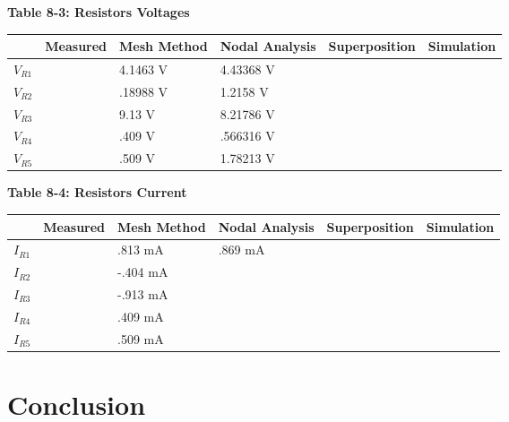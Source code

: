 \documentclass[a4paper]{article}
\begin{document}
\begin{center}
    \small\textbf{Table 8-3: Resistors Voltages \cite{UNCC-ECE-Dept:2023}}
    \begin{tabular}{|p{2 cm}|p{2cm}|p{2 cm}|p{2 cm}|p{2 cm}|p{2 cm}|}
        \hline
         & Measured & Mesh Method & Nodal Analysis & Superposition & Simulation \\
        \hline
        $V_{R1}$ & & 4.1463 V & 4.43368 V & & \\
        \hline
        $V_{R2}$ & & .18988 V & 1.2158 V & & \\
        \hline
        $V_{R3}$ & & 9.13 V & 8.21786 V & & \\
        \hline
        $V_{R4}$ & & .409 V & .566316 V & & \\
        \hline
        $V_{R5}$ & & .509 V & 1.78213 V & & \\
        \hline
    \end{tabular}
\end{center}

\begin{center}
    \small\textbf{Table 8-4: Resistors Current \cite{UNCC-ECE-Dept:2023}}
    \begin{tabular}{|p{2 cm}|p{2cm}|p{2 cm}|p{2 cm}|p{2 cm}|p{2 cm}|}
        \hline
         & Measured & Mesh Method & Nodal Analysis & Superposition & Simulation \\
        \hline
        $I_{R1}$ &  & .813 mA & .869 mA & & \\
        \hline
        $I_{R2}$ & & -.404 mA & & & \\
        \hline
        $I_{R3}$ & & -.913 mA & & & \\
        \hline
        $I_{R4}$ & & .409 mA & & & \\
        \hline
        $I_{R5}$ & & .509 mA & & & \\
        \hline
    \end{tabular}
\end{center}

\section{Conclusion}





\end{document}
